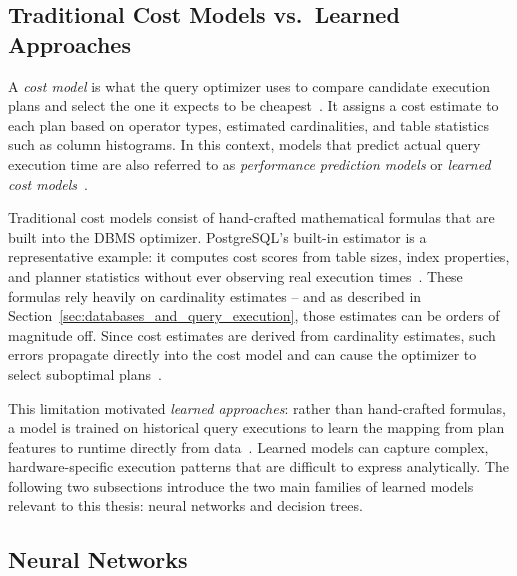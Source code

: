 \subsection{Traditional Cost Models vs.\ Learned Approaches}

A \emph{cost model} is what the query optimizer uses to compare candidate execution plans and select the one it expects to be cheapest~\parencite{silberschatz2019}.
It assigns a cost estimate to each plan based on operator types, estimated cardinalities, and table statistics such as column histograms.
In this context, models that predict actual query execution time are also referred to as \emph{performance prediction models} or \emph{learned cost models}~\parencite{t3, zeroshot}.

Traditional cost models consist of hand-crafted mathematical formulas that are built into the DBMS optimizer.
PostgreSQL's built-in estimator is a representative example: it computes cost scores from table sizes, index properties, and planner statistics without ever observing real execution times~\parencite{postgresql_docs_planner_stats}.
These formulas rely heavily on cardinality estimates -- and as described in Section~\ref{sec:databases_and_query_execution}, those estimates can be orders of magnitude off.
Since cost estimates are derived from cardinality estimates, such errors propagate directly into the cost model and can cause the optimizer to select suboptimal plans~\parencite{leis2018job}.

This limitation motivated \emph{learned approaches}: rather than hand-crafted formulas, a model is trained on historical query executions to learn the mapping from plan features to runtime directly from data~\parencite{zeroshot}.
Learned models can capture complex, hardware-specific execution patterns that are difficult to express analytically.
The following two subsections introduce the two main families of learned models relevant to this thesis: neural networks and decision trees.

\subsection{Neural Networks}\label{subsec:neural_networks}

